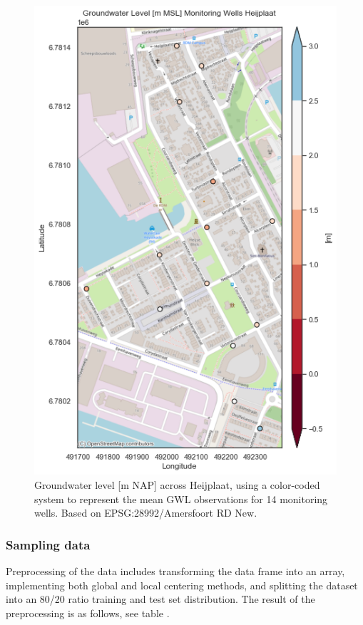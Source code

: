 \begin{figure}[htbp]
    \centering
    \includegraphics[width=0.50\linewidth]{frontmatter/Heijplaat-fig/gwlheij.png}
    \caption{Groundwater level [m NAP] across Heijplaat, using a color-coded system to represent the mean GWL observations for 14 monitoring wells. Based on EPSG:28992/Amersfoort RD New.}
    \label{gwlheij}
\end{figure}


\clearpage

\subsubsection{Sampling data}
Preprocessing of the data includes transforming the data frame into an array, implementing both global and local centering methods, and splitting the dataset into an 80/20 ratio training and test set distribution. The result of the preprocessing is as follows, see table .

